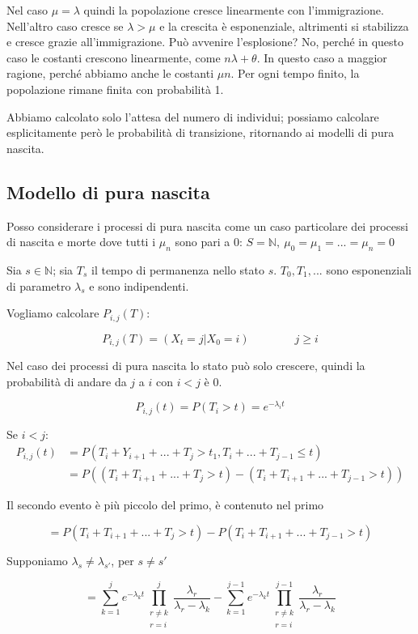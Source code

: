 \documentclass[a4paper,12pt]{book}
\begin{document}
Nel caso $\mu = \lambda$ quindi la popolazione cresce linearmente con l'immigrazione. Nell'altro caso cresce se $ \lambda > \mu $ e la crescita è esponenziale, altrimenti si stabilizza e cresce grazie all'immigrazione. Può avvenire l'esplosione? No, perché in questo caso le costanti crescono linearmente, come $ n\lambda + \theta $. In questo caso a maggior ragione, perché abbiamo anche le costanti $\mu n$. Per ogni tempo finito, la popolazione rimane finita con probabilità 1. 

Abbiamo calcolato solo l'attesa del numero di individui; possiamo calcolare esplicitamente però le probabilità di transizione, ritornando ai modelli di pura nascita.

\subsection{Modello di pura nascita}
Posso considerare i processi di pura nascita come un caso particolare dei processi di nascita e morte dove tutti i $ \mu_n $ sono pari a 0:
$ S = \mathbb{N}, \  \mu_0 = \mu_1 = ... = \mu_n = 0 $ 

Sia $ s \in \mathbb{N} $; sia $ T_s $ il tempo di permanenza nello stato $ s $. $ T_0, T_1, ... $ sono esponenziali di parametro $\lambda_s$ e sono indipendenti. 

Vogliamo calcolare $ P_{i,j}(T): $

$$ P_{i,j}(T) = (X_t = j | X_0 = i) \qquad \qquad j \ge i $$

Nel caso dei processi di pura nascita lo stato può solo crescere, quindi la probabilità di andare da $ j $ a $ i $ con $ i < j $ è 0. 

$$ P_{i,j}(t) = P(T_i > t) = e^{-\lambda_i t} $$

Se $ i < j $: 
\begin{align*}
	P_{i,j}(t) & = P(T_i + Y_{i+1} + ... + T_j > t_1, T_i + ... + T_{j-1} \le t) \\
	& = P((T_i + T_{i+1} + ... + T_j > t) - (T_i + T_{i+1} + ... + T_{j-1} > t))
\end{align*}

Il secondo evento è più piccolo del primo, è contenuto nel primo

$$ = P(T_i + T_{i+1} + ... + T_j > t) - P(T_i + T_{i+1} + ... + T_{j-1} > t) $$

Supponiamo $\lambda_s \ne \lambda_{s'}$, per $ s \ne s' $

$$ = \sum_{k=1}^{j} e^{-\lambda_k t} \prod_{\begin{array}{c}
	r \ne k \\
	r = i
	\end{array}}^{j} \frac{\lambda_r}{\lambda_r - \lambda_k} - \sum_{k=1}^{j-1} e^{-\lambda_k t} \prod_{\begin{array}{c}
	r \ne k \\ 
	r = i
	\end{array}}^{j-1} \frac{\lambda_r}{\lambda_r - \lambda_k}$$
\end{document}
